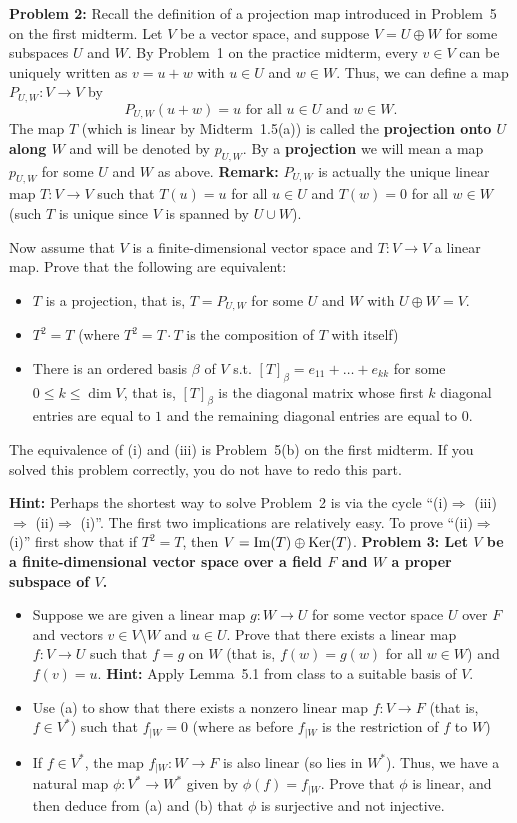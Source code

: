 \documentclass[11pt]{amsart}
\begin{document}
\skv
{\bf Problem 2: }  Recall the definition of a projection map introduced in Problem~5 on the first midterm.
Let $V$ be a vector space, and suppose $V=U\oplus W$
for some subspaces $U$ and $W$. By Problem~1 on the practice midterm, every $v\in V$ can be uniquely written as $v=u+w$
with $u\in U$ and $w\in W$. Thus, we can define a map $P_{U,W}: V\to V$ by 
$$P_{U,W}(u+w)=u \mbox{ for all }u\in U \mbox{ and }w\in W.$$
The map $T$ (which is linear by Midterm~1.5(a)) is called the {\bf projection onto $U$ along $W$} and
will be denoted by $p_{U,W}$. By a {\bf projection} we will mean
a map $p_{U,W}$ for some $U$ and $W$ as above.
\skv
 {\bf Remark:} $P_{U,W}$ is actually the unique linear map $T:V\to V$ such that $T(u)=u$ for all $u\in U$
 and $T(w)=0$ for all $w\in W$ (such $T$ is unique since $V$ is spanned by $U\cup W$).
\skv

Now assume that $V$ is a finite-dimensional vector space and 
$T:V\to V$ a linear map. Prove that the following
are equivalent:
\begin{itemize}
\item[(i)] $T$ is a projection, that is, $T=P_{U,W}$ for some
$U$ and $W$ with $U\oplus W=V$.
\item[(ii)] $T^2=T$ (where $T^2=T\cdot T$ is the composition of $T$ with itself)
\item[(iii)] There is an ordered basis $\beta$ of $V$ s.t.
$[T]_{\beta}=e_{11}+\ldots+e_{kk}$ for some $0\leq k\leq \dim V$,
that is, $[T]_{\beta}$ is the diagonal matrix whose first $k$ diagonal
entries are equal to $1$ and the remaining diagonal entries are equal to $0$.
\end{itemize}
The equivalence of (i) and (iii) is Problem~5(b) on the first midterm. If you solved this problem correctly,
you do not have to redo this part.

{\bf Hint:} Perhaps the shortest way to solve Problem~2 is via the cycle
``(i)$\Rightarrow$ (iii)$\Rightarrow$ (ii)$\Rightarrow$ (i)''.
The first two implications are relatively easy. To prove ``(ii)$\Rightarrow$ (i)''
first show that if $T^2=T$, then $V={\rm Im}(T)\oplus{\rm Ker}(T)$. 
\skv
\bf{Problem 3: }\rm Let $V$ be a finite-dimensional vector space over a field $F$ and $W$ a proper subspace of $V$.
\begin{itemize}
\item[(a)] Suppose we are given a linear map $g:W\to U$ for some vector space $U$ over $F$ and vectors $v\in V\setminus W$ and $u\in U$.
Prove that there exists a linear map $f:V\to U$ such that $f=g$ on $W$ (that is, $f(w)=g(w)$ for all $w\in W$) and $f(v)=u$.
{\bf Hint:} Apply Lemma~5.1 from class to a suitable basis of $V$.
\item[(b)] Use (a) to show that there exists a nonzero linear map $f:V\to F$ (that is, $f\in V^{*}$) such that $f_{|W}=0$
(where as before $f_{|W}$ is the restriction of $f$ to $W$)
\item[(c)] If $f\in V^{*}$, the map $f_{|W}:W\to F$ is also linear (so lies in $W^{*}$). Thus, we have a natural
map $\phi:V^{*}\to W^{*}$ given by $\phi(f)=f_{|W}$. Prove that $\phi$ is linear, and then deduce from (a) and (b)
that $\phi$ is surjective and not injective.
\end{itemize}
\end{document}
